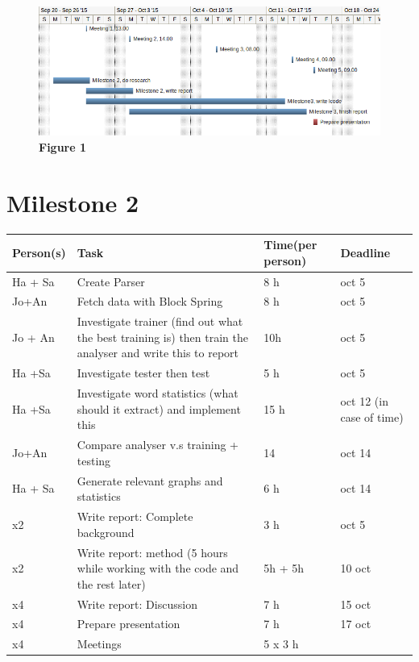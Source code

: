 \documentclass[a4paper]{article}
\begin{document}
\begin{figure}[t]

\hspace*{-1.5in}
\includegraphics[scale=0.7]{gannt.png}
\textbf{Figure 1}
\end{figure}




\newpage
\section*{Milestone 2}
\begin{center}
    \begin{tabular}{| m{2cm} | m{8cm} | p{2cm} | p{2cm} |}
    \hline
    Person(s) & Task & Time(per person) & Deadline\\ \hline
    Ha + Sa & Create Parser & 8 h & oct 5\\ \hline
    Jo+An & Fetch data with Block Spring & 8 h & oct 5 \\ \hline
    Jo + An  & Investigate trainer (find out what the best training is) then train the analyser and write this to report & 10h & oct 5\\ \hline
    Ha +Sa & Investigate tester then test & 5 h & oct 5\\ \hline
    Ha +Sa & Investigate word statistics (what should it extract) and implement this & 15 h & oct 12 (in case of time)\\ \hline
    Jo+An & Compare analyser v.s training + testing & 14 & oct 14\\ \hline
    Ha + Sa & Generate relevant graphs and statistics & 6 h & oct 14\\ \hline
    x2 & Write report: Complete background & 3 h & oct 5\\ \hline
    x2 & Write report: method (5 hours while working with the code and the rest later) & 5h + 5h &  10 oct\\ \hline
    x4 & Write report: Discussion & 7 h & 15 oct\\ \hline
    x4 & Prepare presentation & 7 h & 17 oct\\ \hline
    x4 & Meetings & 5 x 3 h & 
    \end{tabular}
\end{center}
\end{document}
